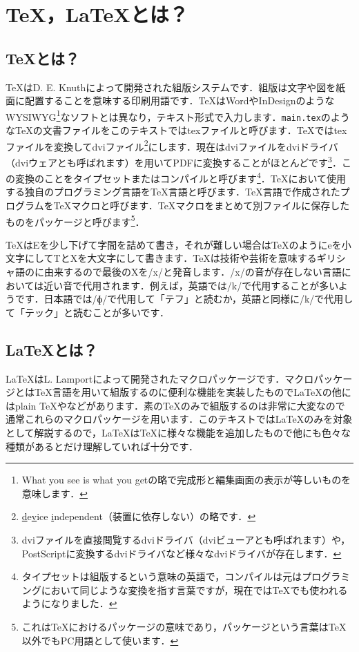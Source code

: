 \section{\TeX，\LaTeX とは？}
\subsection{\TeX とは？}
\TeX はD. E. Knuthによって開発された組版システムです．組版は文字や図を紙面に配置することを意味する印刷用語です．\TeX はWordやInDesignのようなWYSIWYG\footnote{What you see is what you getの略で完成形と編集画面の表示が等しいものを意味します．}なソフトとは異なり，テキスト形式で入力します．\texttt{main.tex}のような\TeX の文書ファイルをこのテキストではtexファイルと呼びます．\TeX ではtexファイルを変換してdviファイル\footnote{\underline{d}e\underline{v}ice \underline{i}ndependent（装置に依存しない）の略です．}にします．現在はdviファイルをdviドライバ（dviウェアとも呼ばれます）を用いてPDFに変換することがほとんどです\footnote{dviファイルを直接閲覧するdviドライバ（dviビューアとも呼ばれます）や，PostScriptに変換するdviドライバなど様々なdviドライバが存在します．}．この変換のことをタイプセットまたはコンパイルと呼びます\footnote{タイプセットは組版するという意味の英語で，コンパイルは元はプログラミングにおいて同じような変換を指す言葉ですが，現在では\TeX でも使われるようになりました．}．\TeX において使用する独自のプログラミング言語を\TeX 言語と呼びます．\TeX 言語で作成されたプログラムを\TeX マクロと呼びます．\TeX マクロをまとめて別ファイルに保存したものをパッケージと呼びます\footnote{これは\TeX におけるパッケージの意味であり，パッケージという言葉は\TeX 以外でもPC用語として使います．}．

\TeX はEを少し下げて字間を詰めて書き，それが難しい場合はTeXのようにeを小文字にしてTとXを大文字にして書きます．\TeX は技術や芸術を意味するギリシャ語のに由来するので最後のXを/x/と発音します．/x/の音が存在しない言語においては近い音で代用されます．例えば，英語では/k/で代用することが多いようです．日本語では/ɸ/で代用して「テフ」と読むか，英語と同様に/k/で代用して「テック」と読むことが多いです．

\subsection{\LaTeX とは？}
\LaTeX はL. Lamportによって開発されたマクロパッケージです．マクロパッケージとは\TeX 言語を用いて組版するのに便利な機能を実装したもので\LaTeX の他にはplain \TeX や\ConTeXt などがあります．素の\TeX のみで組版するのは非常に大変なので通常これらのマクロパッケージを用います．このテキストでは\LaTeX のみを対象として解説するので，\LaTeX は\TeX に様々な機能を追加したもので他にも色々な種類があるとだけ理解していれば十分です．

